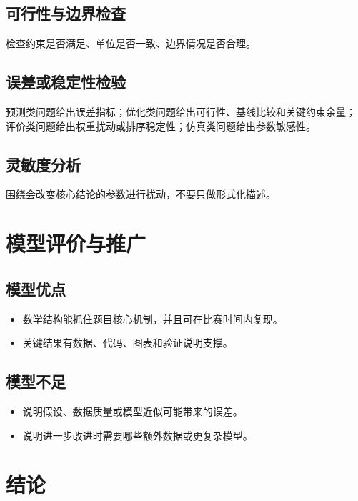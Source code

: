 \documentclass[12pt,a4paper]{ctexart}
\begin{document}
\subsection{可行性与边界检查}

检查约束是否满足、单位是否一致、边界情况是否合理。

\subsection{误差或稳定性检验}

预测类问题给出误差指标；优化类问题给出可行性、基线比较和关键约束余量；
评价类问题给出权重扰动或排序稳定性；仿真类问题给出参数敏感性。

\subsection{灵敏度分析}

围绕会改变核心结论的参数进行扰动，不要只做形式化描述。

\section{模型评价与推广}

\subsection{模型优点}

\begin{itemize}
  \item 数学结构能抓住题目核心机制，并且可在比赛时间内复现。
  \item 关键结果有数据、代码、图表和验证说明支撑。
\end{itemize}

\subsection{模型不足}

\begin{itemize}
  \item 说明假设、数据质量或模型近似可能带来的误差。
  \item 说明进一步改进时需要哪些额外数据或更复杂模型。
\end{itemize}

\section{结论}
\end{document}
